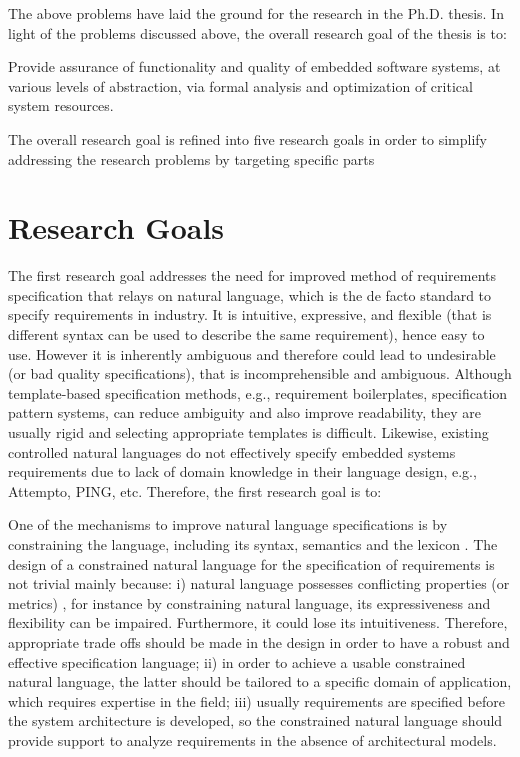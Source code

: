 The above problems have laid the ground for the research in the Ph.D. thesis. In light of the problems discussed above, the overall research goal of the thesis is to:

\begin{researchgoal}
Provide assurance of functionality and quality of embedded software systems, at various levels of abstraction, via formal analysis and optimization of critical system resources.
\end{researchgoal}

The overall research goal is refined into five research goals in order to simplify addressing the research problems by targeting specific parts

\section{Research Goals}\label{research_challenges}
The first research goal addresses the need for improved method of requirements specification that relays on natural language, which is the de facto standard to specify requirements in industry. It is intuitive, expressive, and flexible (that is different syntax can be used to describe the same requirement), hence easy to use. However it is inherently ambiguous and therefore could lead to undesirable (or bad quality specifications), that is incomprehensible and ambiguous. Although template-based specification methods, e.g., requirement boilerplates, specification pattern systems, can reduce ambiguity and also improve readability, they are usually rigid and selecting appropriate templates is difficult. Likewise, existing controlled natural languages do not effectively specify embedded systems requirements due to lack of domain knowledge in their language design, e.g., Attempto, PING, etc. Therefore, the first research goal is to:
\begin{researchgoal}
\end{researchgoal}

One of the mechanisms to improve natural language specifications is by constraining the language, including its syntax, semantics and the lexicon \cite{Kuhn2014ALanguages}. The design of a constrained natural language for the specification of requirements is not trivial mainly because: i) natural language possesses conflicting properties (or metrics) \cite{ieereqspecstandard}, for instance by constraining natural language, its expressiveness and flexibility \cite{Myachykov2013SyntacticRussian} can be impaired. Furthermore, it could lose its intuitiveness. Therefore, appropriate trade offs should be made in the design in order to have a robust and effective specification language; ii) in order to achieve a usable constrained natural language, the latter should be tailored to a specific domain of application, which requires expertise in the field; iii) usually requirements are specified before the system architecture is developed, so the constrained natural language should provide support to analyze requirements in the absence of architectural models.

